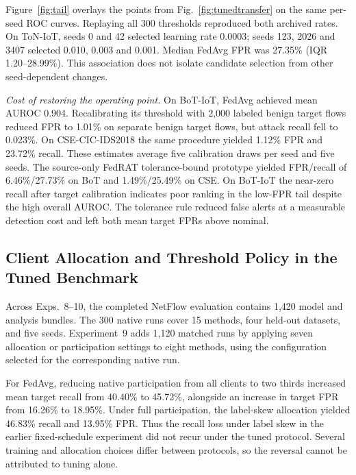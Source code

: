 \documentclass[journal,10pt]{IEEEtran}
\begin{document}
Figure~\ref{fig:tail} overlays the points from Fig.~\ref{fig:tunedtransfer} on the same per-seed ROC curves. Replaying all 300 thresholds reproduced both archived rates. On ToN-IoT, seeds 0 and 42 selected learning rate 0.0003; seeds 123, 2026 and 3407 selected 0.010, 0.003 and 0.001. Median FedAvg FPR was 27.35\% (IQR 1.20--28.99\%). This association does not isolate candidate selection from other seed-dependent changes.

\emph{Cost of restoring the operating point.} On BoT-IoT, FedAvg achieved mean AUROC 0.904. Recalibrating its threshold with 2,000 labeled benign target flows reduced FPR to 1.01\% on separate benign target flows, but attack recall fell to 0.023\%. On CSE-CIC-IDS2018 the same procedure yielded 1.12\% FPR and 23.72\% recall. These estimates average five calibration draws per seed and five seeds. The source-only FedRAT tolerance-bound prototype yielded FPR/recall of 6.46\%/27.73\% on BoT and 1.49\%/25.49\% on CSE. On BoT-IoT the near-zero recall after target calibration indicates poor ranking in the low-FPR tail despite the high overall AUROC. The tolerance rule reduced false alerts at a measurable detection cost and left both mean target FPRs above nominal.

\subsection{Client Allocation and Threshold Policy in the Tuned Benchmark}
Across Exps.~8--10, the completed NetFlow evaluation contains 1,420 model and analysis bundles. The 300 native runs cover 15 methods, four held-out datasets, and five seeds. Experiment~9 adds 1,120 matched runs by applying seven allocation or participation settings to eight methods, using the configuration selected for the corresponding native run.

For FedAvg, reducing native participation from all clients to two thirds increased mean target recall from 40.40\% to 45.72\%, alongside an increase in target FPR from 16.26\% to 18.95\%. Under full participation, the label-skew allocation yielded 46.83\% recall and 13.95\% FPR. Thus the recall loss under label skew in the earlier fixed-schedule experiment did not recur under the tuned protocol. Several training and allocation choices differ between protocols, so the reversal cannot be attributed to tuning alone.
\end{document}
